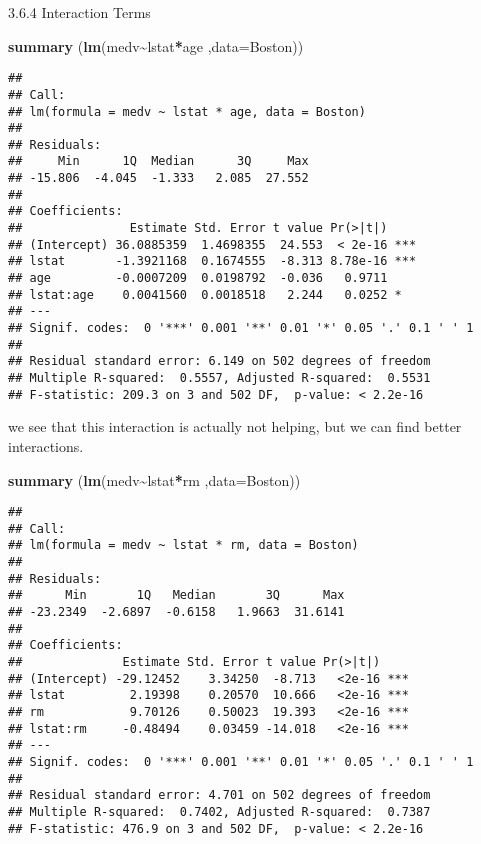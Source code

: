 \documentclass[
]{article}
\newenvironment{Shaded}{\begin{snugshade}}{\end{snugshade}}
\newcommand{\AttributeTok}[1]{\textcolor[rgb]{0.13,0.29,0.53}{#1}}
\newcommand{\FunctionTok}[1]{\textcolor[rgb]{0.13,0.29,0.53}{\textbf{#1}}}
\newcommand{\NormalTok}[1]{#1}
\newcommand{\SpecialCharTok}[1]{\textcolor[rgb]{0.81,0.36,0.00}{\textbf{#1}}}
\begin{document}
3.6.4 Interaction Terms

\begin{Shaded}
\begin{Highlighting}[]
\FunctionTok{summary}\NormalTok{ (}\FunctionTok{lm}\NormalTok{(medv}\SpecialCharTok{\textasciitilde{}}\NormalTok{lstat}\SpecialCharTok{*}\NormalTok{age ,}\AttributeTok{data=}\NormalTok{Boston))}
\end{Highlighting}
\end{Shaded}

\begin{verbatim}
## 
## Call:
## lm(formula = medv ~ lstat * age, data = Boston)
## 
## Residuals:
##     Min      1Q  Median      3Q     Max 
## -15.806  -4.045  -1.333   2.085  27.552 
## 
## Coefficients:
##               Estimate Std. Error t value Pr(>|t|)    
## (Intercept) 36.0885359  1.4698355  24.553  < 2e-16 ***
## lstat       -1.3921168  0.1674555  -8.313 8.78e-16 ***
## age         -0.0007209  0.0198792  -0.036   0.9711    
## lstat:age    0.0041560  0.0018518   2.244   0.0252 *  
## ---
## Signif. codes:  0 '***' 0.001 '**' 0.01 '*' 0.05 '.' 0.1 ' ' 1
## 
## Residual standard error: 6.149 on 502 degrees of freedom
## Multiple R-squared:  0.5557, Adjusted R-squared:  0.5531 
## F-statistic: 209.3 on 3 and 502 DF,  p-value: < 2.2e-16
\end{verbatim}

we see that this interaction is actually not helping, but we can find
better interactions.

\begin{Shaded}
\begin{Highlighting}[]
\FunctionTok{summary}\NormalTok{ (}\FunctionTok{lm}\NormalTok{(medv}\SpecialCharTok{\textasciitilde{}}\NormalTok{lstat}\SpecialCharTok{*}\NormalTok{rm ,}\AttributeTok{data=}\NormalTok{Boston))}
\end{Highlighting}
\end{Shaded}

\begin{verbatim}
## 
## Call:
## lm(formula = medv ~ lstat * rm, data = Boston)
## 
## Residuals:
##      Min       1Q   Median       3Q      Max 
## -23.2349  -2.6897  -0.6158   1.9663  31.6141 
## 
## Coefficients:
##              Estimate Std. Error t value Pr(>|t|)    
## (Intercept) -29.12452    3.34250  -8.713   <2e-16 ***
## lstat         2.19398    0.20570  10.666   <2e-16 ***
## rm            9.70126    0.50023  19.393   <2e-16 ***
## lstat:rm     -0.48494    0.03459 -14.018   <2e-16 ***
## ---
## Signif. codes:  0 '***' 0.001 '**' 0.01 '*' 0.05 '.' 0.1 ' ' 1
## 
## Residual standard error: 4.701 on 502 degrees of freedom
## Multiple R-squared:  0.7402, Adjusted R-squared:  0.7387 
## F-statistic: 476.9 on 3 and 502 DF,  p-value: < 2.2e-16
\end{verbatim}
\end{document}
